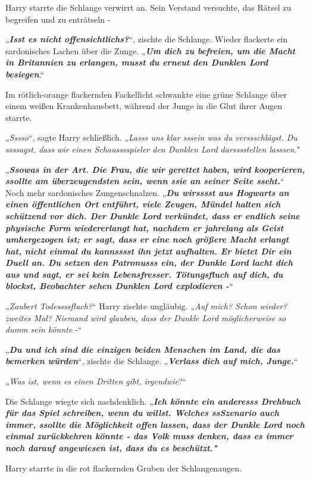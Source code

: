 {Harry starrte die Schlange verwirrt an. Sein Verstand versuchte, das Rätsel zu begreifen und zu enträtseln -

„\textbf{\emph{Isst es nicht offensichtlichs?}}“, zischte die Schlange. Wieder flackerte ein sardonisches Lachen über die Zunge. „\textbf{\emph{Um dich zu befreien, um die Macht in Britannien zu erlangen, musst du erneut den Dunklen Lord besiegen}}.“

Im rötlich-orange flackernden Fackellicht schwankte eine grüne Schlange über einem weißen Krankenhausbett, während der Junge in die Glut ihrer Augen starrte.

„\emph{Sssso}“, sagte Harry schließlich. „\emph{Lasss uns klar sssein was du verssschlägst. Du ssssagst, dass wir einen Schausssspieler den Dunklen Lord darsssstellen lasssen.}"

„\textbf{\emph{Ssowas in der Art. Die Frau, die wir gerettet haben, wird kooperieren, ssollte am überzeugendsten sein, wenn ssie an seiner Seite sseht.}}“ Noch mehr sardonisches Zungenschnalzen. „\textbf{\emph{Du wirsssst aus Hogwarts an einen öffentlichen Ort entführt, viele Zeugen, Mündel halten sich schützend vor dich. Der Dunkle Lord verkündet, dass er endlich seine physische Form wiedererlangt hat, nachdem er jahrelang als Geist umhergezogen ist; er sagt, dass er eine noch größere Macht erlangt hat, nicht einmal du kannsssst ihn jetzt aufhalten. Er bietet Dir ein Duell an. Du setzen den Patronusss ein, der Dunkle Lord lacht dich aus und sagt, er sei kein Lebensfresser. Tötungsfluch auf dich, du blockst, Beobachter sehen Dunklen Lord explodieren -}}“

„\emph{Zaubert Todessssfluch?}“ Harry zischte ungläubig. „\emph{Auf mich? Schon wieder? zweites Mal? Niemand wird glauben, dass der Dunkle Lord möglicherweise so dumm sein könnte} -“

„\textbf{\emph{Du und ich sind die einzigen beiden Menschen im Land, die das bemerken würden}}“, zischte die Schlange. „\textbf{\emph{Verlass dich auf mich, Junge.}}“

„\emph{Was ist, wenn es einen Dritten gibt, irgendwie}?“

Die Schlange wiegte sich nachdenklich. „\textbf{\emph{Ich könnte ein anderesss Drehbuch für das Spiel schreiben, wenn du willst. Welches ssSzenario auch immer, ssollte die Möglichkeit offen lassen, dass der Dunkle Lord noch einmal zurückkehren könnte - das Volk muss denken, dass es immer noch darauf angewiesen ist, dass du es beschützt."}}

Harry starrte in die rot flackernden Gruben der Schlangenaugen.

}
